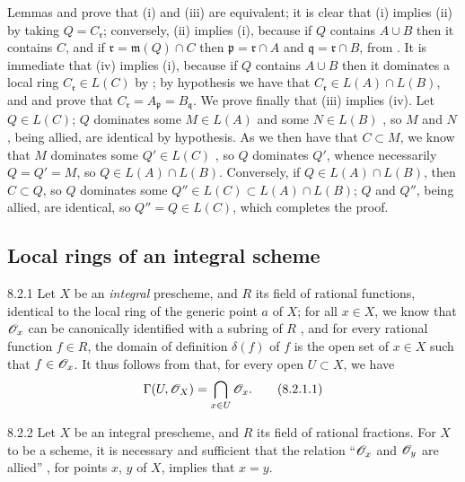 \documentclass[10pt,oneside]{book}
\begin{document}
Lemmas  and  prove that (i) and (iii) are equivalent; it
is clear that (i) implies (ii) by taking $Q=C_\mathfrak{r}$; conversely, (ii)
implies (i), because if $Q$ contains $A\cup B$ then it contains $C$, and if
$\mathfrak{r}=\mathfrak{m}(Q)\cap C$ then $\mathfrak{p}=\mathfrak{r}\cap A$ and
$\mathfrak{q}=\mathfrak{r}\cap B$, from . It is immediate that (iv)
implies (i), because if $Q$ contains $A\cup B$ then it dominates a local ring
$C_\mathfrak{r}\in L(C)$ by ; by hypothesis we have that
$C_\mathfrak{r}\in L(A)\cap L(B)$, and  and  prove that
$C_\mathfrak{r}=A_\mathfrak{p}=B_\mathfrak{q}$. We prove finally that (iii)
implies (iv). Let $Q\in L(C)$; $Q$ dominates some $M\in L(A)$ and some $N\in
L(B)$ , so $M$ and $N$, being allied, are identical by hypothesis.
As we then have that $C\subset M$, we know that $M$ dominates some $Q'\in L(C)$
, so $Q$ dominates $Q'$, whence necessarily  $Q=Q'=M$,
so $Q\in L(A)\cap L(B)$. Conversely, if $Q\in L(A)\cap L(B)$, then $C\subset
Q$, so  $Q$ dominates some $Q''\in L(C)\subset L(A)\cap L(B)$; $Q$
and $Q''$, being allied, are identical, so $Q''=Q\in L(C)$, which completes the
proof.

\subsection{Local rings of an integral scheme}
\label{1-schemes-8.2}

\begin{env}{8.2.1}
\label{env-1.8.2.1}
Let $X$ be an \emph{integral} prescheme, and $R$ its field of
rational functions, identical to the local ring of the generic point $a$ of $X$;
for all $x\in X$, we know that $\mathscr{O}_x$ can be canonically identified with a
subring of $R$ , and for every rational function $f\in R$, the
domain of definition $\delta(f)$ of $f$ is the open set of $x\in X$ such that
$f\in\mathscr{O}_x$. It thus follows from  that, for every open $U\subset X$,
we have
\[
  \Gamma(U,\mathscr{O}_X)=\bigcap_{x\in U}\mathscr{O}_x.\tag{8.2.1.1}
\]
\end{env}

\begin{envs}[Proposition]{8.2.2}
\label{prop-1.8.2.2}
Let $X$ be an integral prescheme,
and $R$ its field of rational fractions. For $X$ to be a scheme, it is
necessary and sufficient that the relation ``$\mathscr{O}_x$ and $\mathscr{O}_y$ are allied''
, for points $x$, $y$ of $X$, implies that $x=y$.
\end{envs}
\end{document}
